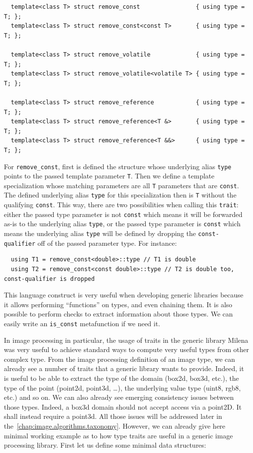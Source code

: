 \begin{verbatim}
  template<class T> struct remove_const                { using type = T; };
  template<class T> struct remove_const<const T>       { using type = T; };

  template<class T> struct remove_volatile             { using type = T; };
  template<class T> struct remove_volatile<volatile T> { using type = T; };

  template<class T> struct remove_reference            { using type = T; };
  template<class T> struct remove_reference<T &>       { using type = T; };
  template<class T> struct remove_reference<T &&>      { using type = T; };
\end{verbatim}

For \texttt{remove\_const}, first is defined the structure whose underlying alias \texttt{type} points to the passed
template parameter \texttt{T}. Then we define a template specialization whose matching parameters are all \texttt{T}
parameters that are \texttt{const}. The defined underlying alias \texttt{type} for this specialization then is
\texttt{T} without the qualifying \texttt{const}. This way, there are two possibilities when calling this
\texttt{trait}: either the passed type parameter is not \texttt{const} which means it will be forwarded as-is to the
underlying alias \texttt{type}, or the passed type parameter is \texttt{const} which means the underlying alias
\texttt{type} will be defined by dropping the \texttt{const-qualifier} off of the passed parameter type. For instance:

\begin{verbatim}
  using T1 = remove_const<double>::type // T1 is double
  using T2 = remove_const<const double>::type // T2 is double too, const-qualifier is dropped
\end{verbatim}

This language construct is very useful when developing generic libraries because it allows performing ``functions'' on
types, and even chaining them. It is also possible to perform checks to extract information about those types. We can
easily write an \texttt{is\_const} metafunction if we need it.

In image processing in particular, the usage of traits in the generic library Milena was very useful to achieve standard
ways to compute very useful types from other complex type. From the image processing definition of an image type, we can
already see a number of traits that a generic library wants to provide. Indeed, it is useful to be able to extract the
type of the domain (box2d, box3d, etc.), the type of the point (point2d, point3d, \ldots), the underlying value type
(uint8, rgb8, etc.) and so on. We can also already see emerging consistency issues between those types. Indeed, a box3d
domain should not accept access via a point2D. It shall instead require a point3d. All those issues will be addressed
later in the~\cref{chap:image.algorithms.taxonomy}. However, we can already give here minimal working example as to how
type traits are useful in a generic image processing library. First let us define some minimal data structures:

